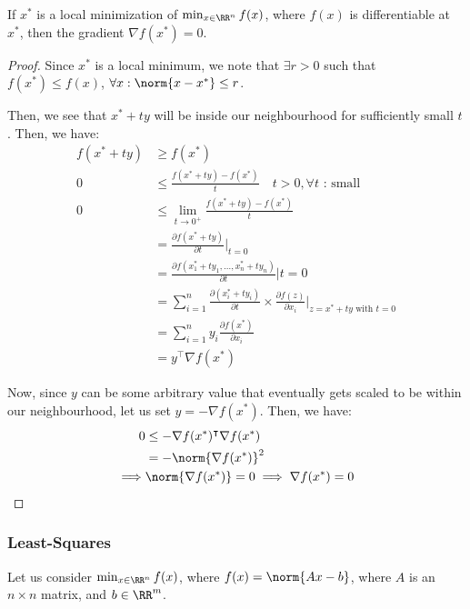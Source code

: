 \documentclass[openany]{book}
\begin{document}
\begin{thm}
	If $x^{*}$ is a local minimization of $\min_{x \in \RR^{n}} f(x)$, where $f(x)$ is differentiable at $x^{*}$, then the gradient $\nabla f(x^{*}) = 0$.
\end{thm}
\begin{proof}
	Since $x^{*}$ is a local minimum, we note that $\exists r > 0$ such that $f(x^{*}) \leq f(x)$, $\forall x : \norm{x - x^{*}} \leq r$. 
	
	Then, we see that $x^{*} + ty$ will be inside our neighbourhood for sufficiently small $t$. Then, we have:
	\begin{align*}
		f(x^{*} + ty) &\geq f(x^{*}) \\
		0 &\leq \frac{f(x^{*} + ty) - f(x^{*})}{t} \quad t > 0, \text{$\forall t$ : small} \\
		0 &\leq \lim_{t \rightarrow 0^{+}} \frac{f(x^{*} + ty) - f(x^{*})}{t} \\
		&= \frac{\partial f(x^{*} + ty)}{\partial t} \big|_{t = 0} \\
		&= \frac{\partial f (x_1^{*} + ty_1, \ldots, x_n^{*} + ty_n)}{\partial t} \big|{t = 0} \\
		&= \sum_{i=1}^{n} \frac{\partial(x_i^{*} + ty_i)}{\partial t} \times \frac{\partial f(z)}{\partial x_i} \big|_{z = x^{*} + ty\text{ with $t = 0$}} \\
		&= \sum_{i=1}^{n} y_i \frac{\partial f(x^{*})}{\partial x_i} \\
		&= y^{\intercal} \nabla f(x^{*})
	\end{align*}

	Now, since $y$ can be some arbitrary value that eventually gets scaled to be within our neighbourhood, let us set $y = -\nabla f(x^{*})$. Then, we have:
	\begin{align*}
		0 &\leq -\nabla f(x^{*})^{\intercal} \nabla f(x^{*}) \\
		&= - \norm{\nabla f (x^{*})}^{2} \\
		\implies & \norm{\nabla f(x^{*})} = 0 \implies \nabla f(x^{*}) = 0
	\end{align*}
\end{proof}

\subsubsection{Least-Squares}
Let us consider $\min_{x \in \RR^{n}} f(x)$, where $f(x) = \norm{Ax - b}$, where $A$ is an $n \times n$ matrix, and $b \in \RR^{m}$.
\end{document}
